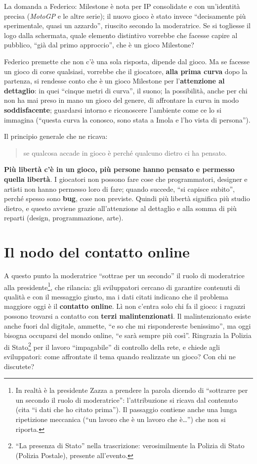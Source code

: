 La domanda a Federico: Milestone è nota per IP consolidate e con un'identità
precisa (\emph{MotoGP} e le altre serie); il nuovo gioco è stato invece ``decisamente
più sperimentale, quasi un azzardo'', riuscito secondo la moderatrice. Se si
togliesse il logo dalla schermata, quale elemento distintivo vorrebbe che facesse
capire al pubblico, ``già dal primo approccio'', che è un gioco Milestone?

Federico premette che non c'è una sola risposta, dipende dal gioco. Ma se
facesse un gioco di corse qualsiasi, vorrebbe che il giocatore, \textbf{alla
prima curva} dopo la partenza, si rendesse conto che è un gioco Milestone per
l'\textbf{attenzione al dettaglio}: in quei ``cinque metri di curva'', il suono;
la possibilità, anche per chi non ha mai preso in mano un gioco del genere, di
affrontare la curva in modo \textbf{soddisfacente}; guardarsi intorno e
riconoscere l'ambiente come ce lo si immagina (``questa curva la conosco, sono
stata a Imola e l'ho vista di persona'').

Il principio generale che ne ricava:
\begin{quote}
  se qualcosa accade in gioco è perché qualcuno dietro ci ha pensato.
\end{quote}
\textbf{Più libertà c'è in un gioco, più persone hanno pensato e permesso quella
libertà}. I giocatori non possono fare cose che programmatori, designer e
artisti non hanno permesso loro di fare; quando succede, ``si capisce subito'',
perché spesso sono \textbf{bug}, cose non previste. Quindi più libertà significa
più studio dietro, e questo avviene grazie all'attenzione al dettaglio e alla
somma di più reparti (design, programmazione, arte).

\section{Il nodo del contatto online}
\label{sec:c1-1-online}

A questo punto la moderatrice ``sottrae per un secondo'' il ruolo di
moderatrice alla presidente\footnote{In realtà è la presidente Zazza a prendere
la parola dicendo di ``sottrarre per un secondo il ruolo di moderatrice'':
l'attribuzione si ricava dal contenuto (cita ``i dati che ho citato prima'').
Il passaggio contiene anche una lunga ripetizione meccanica (``un lavoro che è
un lavoro che è\dots'') che non si riporta.}, che rilancia: gli sviluppatori
cercano di garantire contenuti di qualità e con il messaggio giusto, ma i dati
citati indicano che il problema maggiore oggi è il \textbf{contatto online}.
Lì non c'entra solo chi fa il gioco: i ragazzi possono trovarsi a contatto con
\textbf{terzi malintenzionati}. Il malintenzionato esiste anche fuori dal
digitale, ammette, ``e so che mi rispondereste benissimo'', ma oggi bisogna
occuparsi del mondo online, ``e sarà sempre più così''. Ringrazia la Polizia di
Stato\footnote{``La presenza di Stato'' nella trascrizione: verosimilmente la
Polizia di Stato (Polizia Postale), presente all'evento.} per il lavoro
``impagabile'' di controllo della rete, e chiede agli sviluppatori: come
affrontate il tema quando realizzate un gioco? Con chi ne discutete?

